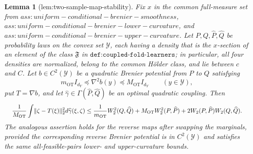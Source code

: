 \documentclass{article}
\newtheorem{lemma}{Lemma}
\begin{document}
\begin{lemma}[lem:two-sample-map-stability]\label{lem:two-sample-map-stability}
Fix \(x\) in the common full-measure set from \(ass:uniform-conditional-brenier-smoothness\), \(ass:uniform-conditional-brenier-lower-curvature\), and \(ass:uniform-conditional-brenier-upper-curvature\). Let \(P,Q,\widehat P,\widehat Q\) be probability laws on the convex set \(\mathcal Y\), each having a density that is the \(x\)-section of an element of the class \(\mathfrak F\) in \(\texttt{def:coupled-fold-learners}\); in particular, all four densities are normalized, belong to the common H\"older class, and lie between \(c\) and \(C\). Let \(b\in C^2(\mathcal Y)\) be a quadratic Brenier potential from \(P\) to \(Q\) satisfying
\[
m_{\mathrm{OT}}I_{d_Y}\preceq\nabla^2b(y)\preceq M_{\mathrm{OT}}I_{d_Y}\qquad(y\in\mathcal Y),
\]
put \(T=\nabla b\), and let \(\widehat\gamma\in\Gamma(\widehat P,\widehat Q)\) be an optimal quadratic coupling. Then
\[
\makebox[\linewidth][c]{\resizebox{0.98\linewidth}{!}{\(\displaystyle \frac1{M_{\mathrm{OT}}}\int\lVert\zeta-T(\xi)\rVert_2^2d\widehat\gamma(\xi,\zeta)
\le \frac1{m_{\mathrm{OT}}}W_2^2(Q,\widehat Q)+M_{\mathrm{OT}}W_2^2(P,\widehat P)
+2W_2(P,\widehat P)W_2(Q,\widehat Q).\)}}
\]
The analogous assertion holds for the reverse maps after swapping the marginals, provided the corresponding reverse Brenier potential is in \(C^2(\mathcal Y)\) and satisfies the same all-feasible-pairs lower- and upper-curvature bounds.
\end{lemma}
\end{document}
